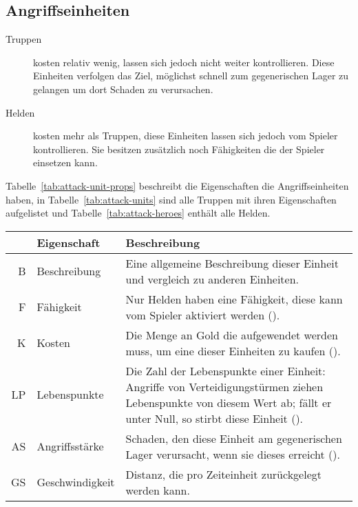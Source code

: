 \subsection{Angriffseinheiten}

\begin{description}
  \item[Truppen]
    kosten relativ wenig, lassen sich jedoch nicht weiter kontrollieren. Diese
    Einheiten verfolgen das Ziel, möglichst schnell zum gegenerischen Lager zu
    gelangen um dort Schaden zu verursachen.

  \item[Helden] kosten mehr als Truppen, diese Einheiten lassen sich jedoch vom
    Spieler kontrollieren. Sie besitzen zusätzlich noch Fähigkeiten die der
    Spieler einsetzen kann.

\end{description}

Tabelle~\ref{tab:attack-unit-props} beschreibt die Eigenschaften die
Angriffseinheiten haben, in Tabelle~\ref{tab:attack-units} sind alle Truppen
mit ihren Eigenschaften aufgelistet und Tabelle~\ref{tab:attack-heroes} enthält
alle Helden.

\begin{table}[htbp]
  \caption{Eigenschaften von Angriffseinheiten}
  \label{tab:attack-unit-props}
  \small
  \begin{longtabu}{rlX}
    \toprule\rowfont{\itshape}
    & Eigenschaft & Beschreibung \\
    \midrule

    B  & Beschreibung
       & Eine allgemeine Beschreibung dieser Einheit und vergleich zu anderen
         Einheiten. \\
    F  & Fähigkeit
       & Nur Helden haben eine Fähigkeit, diese kann vom Spieler aktiviert
         werden (). \\
    K  & Kosten
       & Die Menge an Gold die aufgewendet werden muss, um eine dieser
         Einheiten zu kaufen (). \\
    LP & Lebenspunkte
       & Die Zahl der Lebenspunkte einer Einheit: Angriffe von
         Verteidigungstürmen ziehen Lebenspunkte von diesem Wert ab; fällt er
         unter Null, so stirbt diese Einheit (). \\
    AS & Angriffsstärke
       & Schaden, den diese Einheit am gegenerischen Lager verursacht, wenn sie
         dieses erreicht (). \\
    GS & Geschwindigkeit & Distanz, die pro Zeiteinheit zurückgelegt werden
         kann. \\

    \bottomrule
  \end{longtabu}
\end{table}

